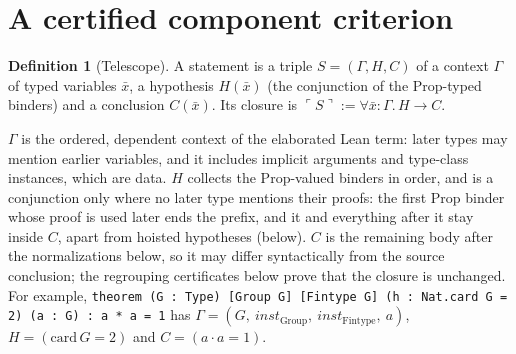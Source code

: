 \documentclass[10pt]{article}
\theoremstyle{definition}
\newtheorem{definition}[theorem]{Definition}
\newcommand{\Cl}[1]{\ulcorner #1 \urcorner}
\begin{document}
\section{A certified component criterion}\label{sec:framework}

\begin{definition}[Telescope]
A statement is a triple $S=(\Gamma,H,C)$ of a context $\Gamma$ of typed variables $\bar x$,
a hypothesis $H(\bar x)$ (the conjunction of the Prop-typed binders) and a conclusion
$C(\bar x)$. Its closure is $\Cl S:=\forall\bar x{:}\Gamma.\,H\to C$.
\end{definition}

$\Gamma$ is the ordered, dependent context of the elaborated Lean term: later types may mention
earlier variables, and it includes implicit arguments and type-class instances, which are data.
$H$ collects the Prop-valued binders in order, and is a conjunction only where no later type
mentions their proofs: the first Prop binder whose proof is used later ends the prefix, and it
and everything after it stay inside $C$, apart from hoisted hypotheses (below). $C$ is the remaining
body after the normalizations below, so it may differ syntactically from the source conclusion;
the regrouping certificates below prove that the closure is unchanged. For example,
\texttt{theorem (G : Type) [Group G] [Fintype G] (h : Nat.card G = 2) (a : G) : a * a = 1}
has $\Gamma=(G,\ \mathit{inst}_{\mathrm{Group}},\ \mathit{inst}_{\mathrm{Fintype}},\ a)$,
$H=(\mathrm{card}\,G=2)$ and $C=(a\cdot a=1)$.
\end{document}

